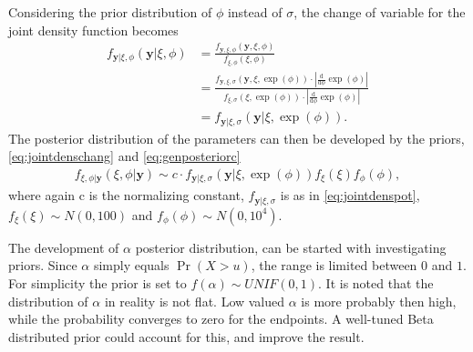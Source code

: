 Considering the prior distribution of $\phi$ instead of $\sigma$, the change of variable for the joint density function becomes 
\begin{align}
f_{\boldsymbol{y}|\xi,\phi}(\boldsymbol{y}|\xi,\phi)&=\frac{f_{\boldsymbol{y},\xi,\phi}(\boldsymbol{y},\xi,\phi)}{f_{\xi,\phi}(\xi,\phi)}\nonumber\\
&=\frac{f_{\boldsymbol{y},\xi,\sigma}\left(\boldsymbol{y},\xi,\exp(\phi)\right)\cdot \left|\frac{\mathrm d}{\mathrm d \phi} \exp(\phi)\right|}{f_{\xi,\sigma}\left(\xi,\exp(\phi)\right)\cdot \left|\frac{\mathrm d}{\mathrm d \phi} \exp(\phi)\right|}\nonumber\\
&=f_{\boldsymbol{y}|\xi,\sigma}\left(\boldsymbol{y}|\xi,\exp(\phi)\right). \label{eq:jointdenschang}
\end{align}
The posterior distribution of the parameters can then be developed by the priors, \eqref{eq:jointdenschang} and \eqref{eq:genposteriorc}
\begin{align}
f_{\xi,\phi|\boldsymbol{y}}(\xi,\phi|\boldsymbol{y})\sim c \cdot f_{\boldsymbol{y}|\xi,\sigma}\left(\boldsymbol{y}|\xi,\exp(\phi)\right)f_{\xi}(\xi)f_{\phi}(\phi), \label{eq:potpost}
\end{align}
where again c is the normalizing constant, $f_{\boldsymbol{y}|\xi,\sigma}$ is as in \eqref{eq:jointdenspot}, $f_{\xi}(\xi)\sim N(0,100)$ and $f_{\phi}(\phi) \sim N(0,10^4)$.

The development of $\alpha$ posterior distribution, can be started with investigating priors. Since $\alpha$ simply equals $\Pr(X>u)$, the range is limited between $0$ and $1$. For simplicity the prior is set to $f(\alpha) \sim UNIF(0,1)$. It is noted that the distribution of $\alpha$ in reality is not flat. Low valued $\alpha$ is more probably then high, while the probability converges to zero for the endpoints. A well-tuned Beta distributed prior could account for this, and improve the result.

